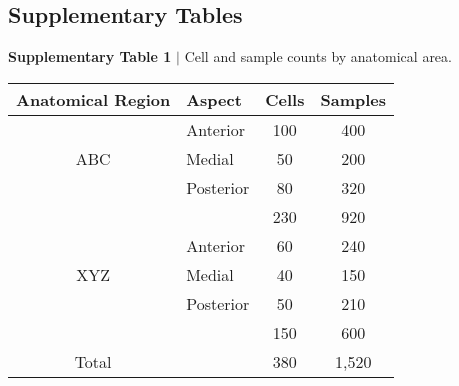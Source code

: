 
\subsection*{Supplementary Tables}

{
  \small
  {\bf Supplementary Table 1} $|$ Cell and sample counts by anatomical area. 
}

\begin{center}
\begin{tabular}{clcc}
  \toprule
  {Anatomical Region} & {Aspect}  & {Cells} & {Samples} \\
  \midrule
  \multirow{3}{*}{ABC}
    & Anterior 	&	100	& 400	\\
    & Medial 	  &	50  &	200	\\
    & Posterior &	80	&	320	\\
    \cmidrule{3-4}
    & {} 	      & 230	& 920 \\
	  \cmidrule{2-4}
  \multirow{3}{*}{XYZ}
    & Anterior 	&	60	&	240	\\
    & Medial 	  &	40  &	150	\\
    & Posterior &	50	&	210	\\
    \cmidrule{3-4}
	  & {} 		    & 150	& 600 \\
	  \midrule
  Total & {}    & 380	& 1,520	\\
  \bottomrule
\end{tabular}
\end{center}

